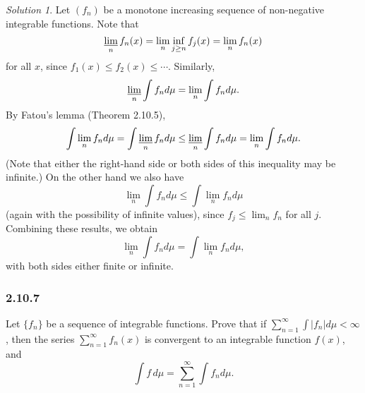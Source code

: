 \documentclass{report}
\theoremstyle{remark}
\newtheorem*{solution}{Solution}
\begin{document}
\begin{solution}
  Let $(f_n)$ be a monotone increasing sequence of non-negative integrable functions. Note that
  \begin{equation*}
    \varliminf_n f_n(x) = \lim_n \inf_{j \ge n} f_j(x) = \lim_n f_n(x)
  \end{equation*}
  for all $x$, since $f_1(x) \le f_2(x) \le \dotsm$. Similarly,
  \begin{equation*}
    \varliminf_n \int f_n d\mu = \lim_n \int f_n d\mu.
  \end{equation*}
  By Fatou's lemma (Theorem 2.10.5),
  \begin{equation*}
    \int \lim_n f_n d\mu = \int \varliminf_n f_n d\mu \le \varliminf_n \int f_n d\mu = \lim_n \int f_n d\mu.
  \end{equation*}
  (Note that either the right-hand side or both sides of this inequality may be infinite.) On the other hand we also have
  \begin{equation*}
    \lim_n \int f_n d\mu \le \int \lim_n f_n d\mu
  \end{equation*}
  (again with the possibility of infinite values), since $f_j \le \lim_n f_n$ for all $j$. Combining these results, we obtain
  \begin{equation*}
    \lim_n \int f_n d\mu = \int \lim_n f_n d\mu,
  \end{equation*}
  with both sides either finite or infinite.
\end{solution}

\subsubsection*{2.10.7}
Let $\{f_n\}$ be a sequence of integrable functions. Prove that if $\sum_{n=1}^\infty \int |f_n| d\mu < \infty$, then the series $\sum_{n=1}^\infty f_n(x)$ is convergent to an integrable function $f(x)$, and
\begin{equation*}
  \int f \, d\mu = \sum_{n=1}^\infty \int f_n d\mu.
\end{equation*}
\end{document}

